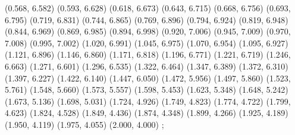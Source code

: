 {  (0.568, 6.582)
  (0.593, 6.628)
  (0.618, 6.673)
  (0.643, 6.715)
  (0.668, 6.756)
  (0.693, 6.795)
  (0.719, 6.831)
  (0.744, 6.865)
  (0.769, 6.896)
  (0.794, 6.924)
  (0.819, 6.948)
  (0.844, 6.969)
  (0.869, 6.985)
  (0.894, 6.998)
  (0.920, 7.006)
  (0.945, 7.009)
  (0.970, 7.008)
  (0.995, 7.002)
  (1.020, 6.991)
  (1.045, 6.975)
  (1.070, 6.954)
  (1.095, 6.927)
  (1.121, 6.896)
  (1.146, 6.860)
  (1.171, 6.818)
  (1.196, 6.771)
  (1.221, 6.719)
  (1.246, 6.663)
  (1.271, 6.601)
  (1.296, 6.535)
  (1.322, 6.464)
  (1.347, 6.389)
  (1.372, 6.310)
  (1.397, 6.227)
  (1.422, 6.140)
  (1.447, 6.050)
  (1.472, 5.956)
  (1.497, 5.860)
  (1.523, 5.761)
  (1.548, 5.660)
  (1.573, 5.557)
  (1.598, 5.453)
  (1.623, 5.348)
  (1.648, 5.242)
  (1.673, 5.136)
  (1.698, 5.031)
  (1.724, 4.926)
  (1.749, 4.823)
  (1.774, 4.722)
  (1.799, 4.623)
  (1.824, 4.528)
  (1.849, 4.436)
  (1.874, 4.348)
  (1.899, 4.266)
  (1.925, 4.189)
  (1.950, 4.119)
  (1.975, 4.055)
  (2.000, 4.000)
};
